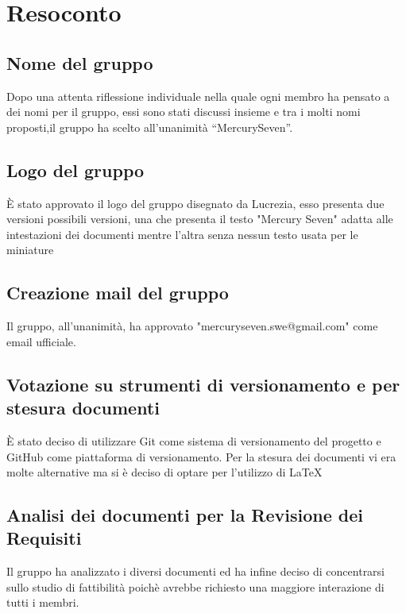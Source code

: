 \newpage

\section{Resoconto}

\subsection{Nome del gruppo}

Dopo una attenta riflessione individuale nella quale ogni membro ha pensato a dei nomi per il gruppo, essi sono stati discussi insieme e tra i molti nomi proposti,il gruppo ha scelto all’unanimità “MercurySeven”.

\subsection{Logo del gruppo}

È stato approvato il logo del gruppo disegnato da Lucrezia, esso presenta due versioni possibili versioni, una che presenta il testo "Mercury Seven" adatta alle intestazioni dei documenti mentre l'altra senza nessun testo usata per le miniature

\subsection{Creazione mail del gruppo}

Il gruppo, all'unanimità, ha approvato "mercuryseven.swe@gmail.com" come email ufficiale.

\subsection{Votazione su strumenti di versionamento e per stesura documenti}

È stato deciso di utilizzare Git come sistema di versionamento del progetto e GitHub come piattaforma di versionamento. Per la stesura dei documenti vi era molte alternative ma si è deciso di optare per l'utilizzo di \LaTeX


\subsection{Analisi dei documenti per la Revisione dei Requisiti}

Il gruppo ha analizzato i diversi documenti ed ha infine deciso di concentrarsi sullo studio di fattibilità poichè avrebbe richiesto una maggiore interazione di tutti i membri.

